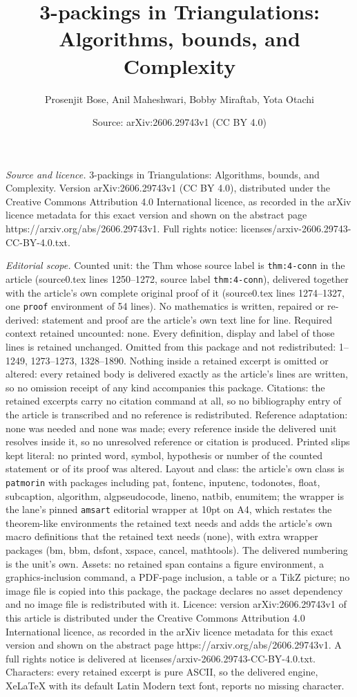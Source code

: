 \documentclass[10pt,a4paper]{amsart}
\title[3-packings in Triangulations: Algorithms, bounds, and Comple]{3-packings in Triangulations: Algorithms, bounds, and Complexity}
\author{Prosenjit Bose, Anil Maheshwari, Bobby Miraftab, Yota Otachi}
\date{Source: arXiv:2606.29743v1 (CC BY 4.0)}
\begin{document}
\maketitle

\noindent\emph{Source and licence.} 3-packings in Triangulations: Algorithms, bounds, and Complexity. Version arXiv:2606.29743v1 (CC BY 4.0), distributed under the Creative Commons Attribution 4.0 International licence, as recorded in the arXiv licence metadata for this exact version and shown on the abstract page https://arxiv.org/abs/2606.29743v1. Full rights notice: licenses/arxiv-2606.29743-CC-BY-4.0.txt.\par\smallskip

\noindent\textit{Editorial scope.} Counted unit: the Thm whose source label is \texttt{thm:4-conn} in the article (source0.tex lines 1250--1272, source label \texttt{thm:4-conn}), delivered together with the article's own complete original proof of it (source0.tex lines 1274--1327, one \texttt{proof} environment of 54 lines). No mathematics is written, repaired or re-derived: statement and proof are the article's own text line for line. Required context retained uncounted: none. Every definition, display and label of those lines is retained unchanged. Omitted from this package and not redistributed: 1--1249, 1273--1273, 1328--1890. Nothing inside a retained excerpt is omitted or altered: every retained body is delivered exactly as the article's lines are written, so no omission receipt of any kind accompanies this package. Citations: the retained excerpts carry no citation command at all, so no bibliography entry of the article is transcribed and no reference is redistributed. Reference adaptation: none was needed and none was made; every reference inside the delivered unit resolves inside it, so no unresolved reference or citation is produced. Printed slips kept literal: no printed word, symbol, hypothesis or number of the counted statement or of its proof was altered. Layout and class: the article's own class is \texttt{patmorin} with packages including pat, fontenc, inputenc, todonotes, float, subcaption, algorithm, algpseudocode, lineno, natbib, enumitem; the wrapper is the lane's pinned \texttt{amsart} editorial wrapper at 10pt on A4, which restates the theorem-like environments the retained text needs and adds the article's own macro definitions that the retained text needs (none), with extra wrapper packages (bm, bbm, dsfont, xspace, cancel, mathtools). The delivered numbering is the unit's own. Assets: no retained span contains a figure environment, a graphics-inclusion command, a PDF-page inclusion, a table or a TikZ picture; no image file is copied into this package, the package declares no asset dependency and no image file is redistributed with it. Licence: version arXiv:2606.29743v1 of this article is distributed under the Creative Commons Attribution 4.0 International licence, as recorded in the arXiv licence metadata for this exact version and shown on the abstract page https://arxiv.org/abs/2606.29743v1. A full rights notice is delivered at licenses/arxiv-2606.29743-CC-BY-4.0.txt. Characters: every retained excerpt is pure ASCII, so the delivered engine, XeLaTeX with its default Latin Modern text font, reports no missing character.
\end{document}
